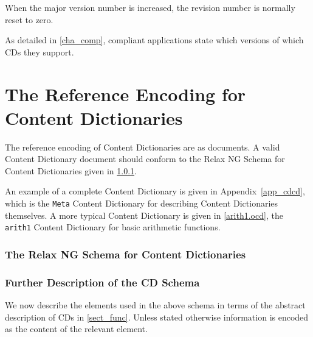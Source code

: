 When the major version number is increased, the revision number is normally reset to zero.
      
As detailed in \ref{cha_comp}, \OM compliant applications state which versions of which
CDs they support.
  
\section{The Reference Encoding for Content Dictionaries}\label{sec_xml_cd}
    
The reference encoding of Content Dictionaries are as \XML documents.  A valid Content
Dictionary document should conform to the Relax NG Schema for Content Dictionaries given
in \ref{sec_cd_schema}.
    
An example of a complete Content Dictionary is given in Appendix~\ref{app_cdcd}, which is
the \lstinline|Meta| Content Dictionary for describing Content Dictionaries themselves. A
more typical Content Dictionary is given in \ref{arith1.ocd}, the \lstinline|arith1|
Content Dictionary for basic arithmetic functions.

    
\subsubsection{The Relax NG Schema for Content Dictionaries}\label{sec_cd_schema}



\subsubsection{Further Description of the CD Schema}\label{sect_pcdata}

We now describe the elements used in the above schema in terms of the abstract description
of CDs in \ref{sect_func}.  Unless stated otherwise information is encoded as the content
of the relevant element.

